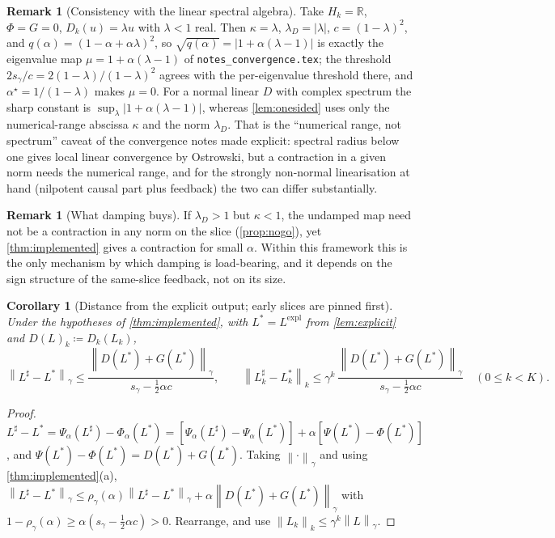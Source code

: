 \documentclass[11pt,a4paper]{article}
\theoremstyle{plain}
\newtheorem{corollary}[theorem]{Corollary}
\theoremstyle{definition}
\theoremstyle{definition}
\newtheorem{remark}[theorem]{Remark}
\newcommand{\R}{\mathbb{R}}
\newcommand{\norm}[1]{\left\lVert #1 \right\rVert}
\newcommand{\abs}[1]{\left\lvert #1 \right\rvert}
\newcommand{\Lev}{L}
\newcommand{\Phimap}{\Phi}
\newcommand{\Phal}{\Phi_\alpha}
\newcommand{\Psimap}{\Psi}
\newcommand{\Psal}{\Psi_\alpha}
\newcommand{\Lexpl}{\Lev^{\mathrm{expl}}}
\begin{document}
\begin{remark}[Consistency with the linear spectral algebra]\label{rem:linear}
Take $H_k = \R$, $\Phimap = G = 0$, $D_k(u) = \lambda u$ with $\lambda < 1$ real. Then $\kappa = \lambda$, $\lambda_D = \abs{\lambda}$, $c = (1 - \lambda)^2$, and $q(\alpha) = (1 - \alpha + \alpha\lambda)^2$, so $\sqrt{q(\alpha)} = \abs{1 + \alpha(\lambda - 1)}$ is exactly the eigenvalue map $\mu = 1 + \alpha(\lambda - 1)$ of \texttt{notes\_convergence.tex}; the threshold $2 s_\gamma / c = 2(1-\lambda)/(1-\lambda)^2$ agrees with the per-eigenvalue threshold there, and $\alpha^\star = 1/(1-\lambda)$ makes $\mu = 0$. For a normal linear $D$ with complex spectrum the sharp constant is $\sup_\lambda \abs{1 + \alpha(\lambda - 1)}$, whereas \cref{lem:onesided} uses only the numerical-range abscissa $\kappa$ and the norm $\lambda_D$. That is the ``numerical range, not spectrum'' caveat of the convergence notes made explicit: spectral radius below one gives local linear convergence by Ostrowski, but a contraction in a given norm needs the numerical range, and for the strongly non-normal linearisation at hand (nilpotent causal part plus feedback) the two can differ substantially.
\end{remark}

\begin{remark}[What damping buys]\label{rem:buys}
If $\lambda_D > 1$ but $\kappa < 1$, the undamped map need not be a contraction in any norm on the slice (\cref{prop:nogo}), yet \cref{thm:implemented} gives a contraction for small $\alpha$. Within this framework this is the only mechanism by which damping is load-bearing, and it depends on the sign structure of the same-slice feedback, not on its size.
\end{remark}

\begin{corollary}[Distance from the explicit output; early slices are pinned first]\label{cor:distance}
Under the hypotheses of \cref{thm:implemented}, with $\Lev^* = \Lexpl$ from \cref{lem:explicit} and $D(\Lev)_k \coloneqq D_k(\Lev_k)$,
\[
  \norm{\Lev^\sharp - \Lev^*}_\gamma \le \frac{\norm{D(\Lev^*) + G(\Lev^*)}_\gamma}{s_\gamma - \tfrac12 \alpha c},
  \qquad
  \norm{\Lev^\sharp_k - \Lev^*_k}_k \le \gamma^{k}\, \frac{\norm{D(\Lev^*) + G(\Lev^*)}_\gamma}{s_\gamma - \tfrac12 \alpha c} \quad (0 \le k < K).
\]
\end{corollary}

\begin{proof}
$\Lev^\sharp - \Lev^* = \Psal(\Lev^\sharp) - \Phal(\Lev^*) = [\Psal(\Lev^\sharp) - \Psal(\Lev^*)] + \alpha [\Psimap(\Lev^*) - \Phimap(\Lev^*)]$, and $\Psimap(\Lev^*) - \Phimap(\Lev^*) = D(\Lev^*) + G(\Lev^*)$. Taking $\norm{\cdot}_\gamma$ and using \cref{thm:implemented}(a), $\norm{\Lev^\sharp - \Lev^*}_\gamma \le \rho_\gamma(\alpha) \norm{\Lev^\sharp - \Lev^*}_\gamma + \alpha \norm{D(\Lev^*) + G(\Lev^*)}_\gamma$ with $1 - \rho_\gamma(\alpha) \ge \alpha(s_\gamma - \tfrac12 \alpha c) > 0$. Rearrange, and use $\norm{\Lev_k}_k \le \gamma^k \norm{\Lev}_\gamma$.
\end{proof}
\end{document}
